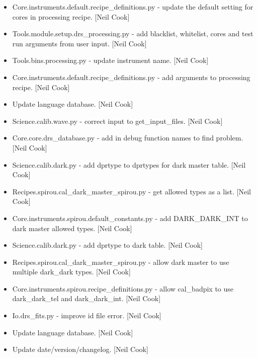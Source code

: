 \documentclass[a4paper,10pt,english]{report}
\begin{document}
\begin{itemize}
\item {} 
Core.instruments.default.recipe\_definitions.py - update the default
setting for \textendash{}cores in processing recipe. {[}Neil Cook{]}

\item {} 
Tools.module.setup.drs\_processing.py - add blacklist, whitelist, cores
and test run arguments from user input. {[}Neil Cook{]}

\item {} 
Tools.bins.processing.py - update instrument name. {[}Neil Cook{]}

\item {} 
Core.instruments.default.recipe\_definitions.py - add arguments to
processing recipe. {[}Neil Cook{]}

\item {} 
Update language database. {[}Neil Cook{]}

\item {} 
Science.calib.wave.py - correct input to get\_input\_files. {[}Neil Cook{]}

\item {} 
Core.core.drs\_database.py - add in debug function names to find
problem. {[}Neil Cook{]}

\item {} 
Science.calib.dark.py - add dprtype to dprtypes for dark master table.
{[}Neil Cook{]}

\item {} 
Recipes.spirou.cal\_dark\_master\_spirou.py - get allowed types as a
list. {[}Neil Cook{]}

\item {} 
Core.instruments.spirou.default\_constants.py - add DARK\_DARK\_INT to
dark master allowed types. {[}Neil Cook{]}

\item {} 
Science.calib.dark.py - add dprtype to dark table. {[}Neil Cook{]}

\item {} 
Recipes.spirou.cal\_dark\_master\_spirou.py - allow dark master to use
multiple dark\_dark types. {[}Neil Cook{]}

\item {} 
Core.instruments.spirou.recipe\_definitions.py - allow cal\_badpix to
use dark\_dark\_tel and dark\_dark\_int. {[}Neil Cook{]}

\item {} 
Io.drs\_fits.py - improve id file error. {[}Neil Cook{]}

\item {} 
Update language database. {[}Neil Cook{]}

\item {} 
Update date/version/changelog. {[}Neil Cook{]}

\end{itemize}
\end{document}
